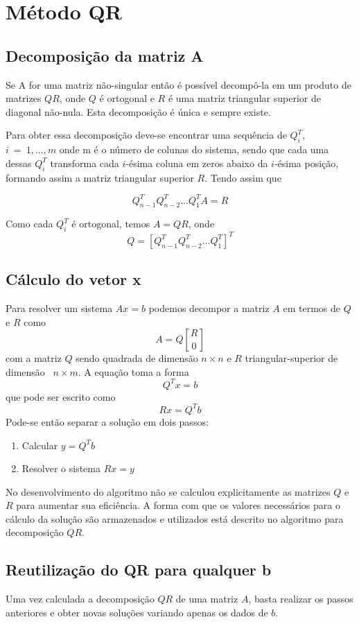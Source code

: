 \chapter{Método QR}

	\section{Decomposição da matriz A}
	Se A for uma matriz não-singular então é possível decompô-la em um produto de matrizes 
	$QR$, onde $Q$ é ortogonal e $R$ é uma matriz triangular superior de diagonal não-nula. Esta decomposição é única e sempre existe.
	
	Para obter essa decomposição deve-se encontrar uma sequência de $Q_i ^T$, $i~ =~ 1,...,m$ onde m é o número de colunas do sistema, sendo que cada uma dessas $Q_i^T$ transforma cada $i$-ésima coluna em zeros abaixo da $i$-ésima posição, formando assim a matriz triangular superior $R$.\cite{sawp} Tendo assim que
	
	\[Q_{n-1} ^TQ_{n-2} ^T \ldots Q_{1} ^T A = R\]
	
	Como cada $Q_i ^T$ é ortogonal, temos $A = QR$, onde \[Q = [Q_{n-1} ^T Q_{n-2} ^T \ldots Q_{1} ^T]^T \]
	\section{Cálculo do vetor x}
	Para resolver um sistema $Ax=b$ podemos decompor a matriz $A$ em termos de $Q$ e $R$ como \[ A = Q{R \brack 0}\] com a matriz $Q$ sendo quadrada de dimensão $n\times n$ e $R$ triangular-superior de dimensão~ $n\times m$.
	A equação toma a forma \[Q^Tx = b\] que pode ser escrito como \[Rx=Q^Tb\]
	Pode-se então separar a solução em dois passos:
	\begin{enumerate}
	\item Calcular $y = Q^Tb$
	\item Resolver o sistema $Rx = y$
	\end{enumerate}
	
	No desenvolvimento do algoritmo não se calculou explicitamente as matrizes $Q$ e $R$ para aumentar sua eficiência. A forma com que os valores necessários para o cálculo da solução são armazenados e utilizados está descrito no algoritmo para decomposição $QR$.
	
	\section{Reutilização do QR para qualquer b}
	Uma vez calculada a decomposição $QR$ de uma matriz $A$, basta realizar os passos anteriores e obter novas soluções variando apenas os dados de $b$.

